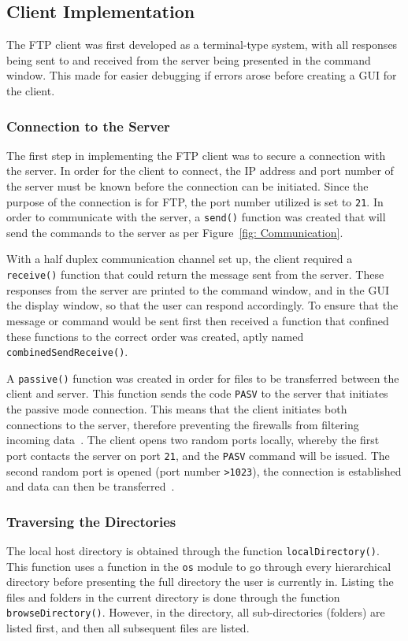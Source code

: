 \documentclass[10pt,twocolumn]{witseiepaper}
\def\code#1{\texttt{#1}}
\begin{document}
\subsection{Client Implementation}
\label{sec: Client Implementation}
The FTP client was first developed as a terminal-type system, with all responses being sent to and received from the server being presented in the command window. This made for easier debugging if errors arose before creating a GUI for the client.

\subsubsection{Connection to the Server}
\label{sec: Connection to server}
The first step in implementing the FTP client was to secure a connection with the server. In order for the client to connect, the IP address and port number of the server must be known before the connection can be initiated. Since the purpose of the connection is for FTP, the port number utilized is set to \code{21}. In order to communicate with the server, a \code{send()} function was created that will send the commands to the server as per Figure~\ref{fig: Communication}.

With a half duplex communication channel set up, the client required a \code{receive()} function that  could return the message sent from the server. These responses from the server are printed to the command window, and in the GUI the display window, so that the user can respond accordingly. To ensure that the message or command would be sent first then received a function that confined these functions to the correct order was created, aptly named \code{combinedSendReceive()}.

A \code{passive()} function was created in order for files to be transferred between the client and server. This function sends the code \code{PASV} to the server that initiates the passive mode connection. This means that the client initiates both connections to the server, therefore preventing the firewalls from filtering incoming data~\cite{passive}. The client opens two random ports locally, whereby the first port contacts the server on port \code{21}, and the \code{PASV} command will be issued. The second random port is opened (port number \code{>1023}), the connection is established and data can then be transferred~\cite{passive}.

\subsubsection{Traversing the Directories}
\label{sec: Traversing directories}
The local host directory is obtained through the function \code{localDirectory()}. This function uses a function in the \code{os} module to go through every hierarchical directory before presenting the full directory the user is currently in. Listing the files and folders in the current directory is done through the function \code{browseDirectory()}. However, in the directory, all sub-directories (folders) are listed first, and then all subsequent files are listed.
\end{document}

